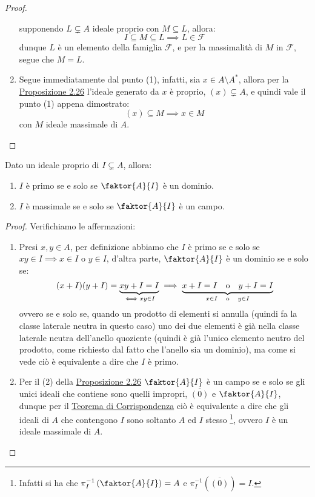 \documentclass[11pt]{scrartcl}
\begin{document}
\begin{proof}
\begin{enumerate}
            supponendo $L \subsetneq A$ ideale proprio con $M \subseteq L$, allora:
                \[ I \subseteq M \subseteq L \implies L \in \mathcal{F}
                    \]
            dunque $L$ è un elemento della famiglia $\mathcal{F}$, e per la massimalità di $M$ in $\mathcal{F}$, segue che $M = L$.
        \item Segue immediatamente dal punto (1), infatti, sia $x \in A \setminus A^*$, allora per la \hyperref[2.26]{Proposizione 2.26} l'ideale generato da $x$ è proprio,
        $(x) \subsetneq A$, e quindi vale il punto (1) appena dimostrato:
            \[ (x) \subseteq M \implies x \in M
                \]
        con $M$ ideale massimale di $A$.
    \end{enumerate}
\end{proof}

\begin{proposition}
    \label{2.56}
    Dato un ideale proprio di $I \subsetneq A$, allora:
    \begin{enumerate}[(1)]
        \item $I$ è primo se e solo se $\faktor{A}{I}$ è un dominio.
        \item $I$ è massimale se e solo se $\faktor{A}{I}$ è un campo.
    \end{enumerate}
\end{proposition}

\begin{proof}
    Verifichiamo le affermazioni:
    \begin{enumerate}[(1)]
        \item Presi $x,y \in A$, per definizione abbiamo che $I$ è primo se e solo se $xy \in I \implies x \in I$ o $y \in I$, d'altra parte, $\faktor{A}{I}$ è un dominio se e solo se:
            \[ (x+I)(y+I) = \underbrace{xy + I = I}_{\iff xy \in I} \implies \underbrace{x+I = I \quad\text o\quad y+I = I}_{x \in I \quad\text o\quad y \in I} 
                \]
            ovvero se e solo se, quando un prodotto di elementi si annulla (quindi fa la classe laterale neutra in questo caso) uno dei due elementi è già nella classe laterale neutra 
            dell'anello quoziente (quindi è già l'unico elemento neutro del prodotto, come richiesto dal fatto che l'anello sia un dominio), ma come si vede ciò è equivalente a dire che $I$ è primo.
        \item Per il (2) della \hyperref[2.26]{Proposizione 2.26} $\faktor{A}{I}$ è un campo se e solo se gli unici ideali che contiene sono quelli impropri, $\overline{(0)}$ e $\faktor{A}{I}$, dunque per il 
        \hyperref[corrispondenza]{Teorema di Corrispondenza} ciò è equivalente a dire che gli ideali di $A$ che contengono $I$ sono soltanto $A$ ed $I$ stesso \footnote{Infatti si ha che
        $\pi_I^{-1}\left(\faktor{A}{I}\right) = A$ e $\pi_I^{-1}(\overline{(0)}) = I$.}, ovvero $I$ è un ideale massimale di $A$.
    \end{enumerate}
\end{proof}
\end{document}
